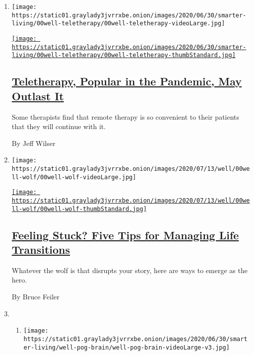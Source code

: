 \begin{enumerate}
\def\labelenumi{\arabic{enumi}.}
\item
  \texttt{[image: https://static01.graylady3jvrrxbe.onion/images/2020/06/30/smarter-living/00well-teletherapy/00well-teletherapy-videoLarge.jpg]}

  \href{/2020/07/09/well/mind/teletherapy-mental-health-coronavirus.html}{\texttt{[image: https://static01.graylady3jvrrxbe.onion/images/2020/06/30/smarter-living/00well-teletherapy/00well-teletherapy-thumbStandard.jpg]}}

  \hypertarget{teletherapy-popular-in-the-pandemic-may-outlast-it}{%
  \subsection{\texorpdfstring{\href{/2020/07/09/well/mind/teletherapy-mental-health-coronavirus.html}{Teletherapy,
  Popular in the Pandemic, May Outlast
  It}}{Teletherapy, Popular in the Pandemic, May Outlast It}}\label{teletherapy-popular-in-the-pandemic-may-outlast-it}}

  Some therapists find that remote therapy is so convenient to their
  patients that they will continue with it.

  By Jeff Wilser
\item
  \texttt{[image: https://static01.graylady3jvrrxbe.onion/images/2020/07/13/well/00well-wolf/00well-wolf-videoLarge.jpg]}

  \href{/2020/07/16/well/mind/managing-life-transitions.html}{\texttt{[image: https://static01.graylady3jvrrxbe.onion/images/2020/07/13/well/00well-wolf/00well-wolf-thumbStandard.jpg]}}

  \hypertarget{feeling-stuck-five-tips-for-managing-life-transitions}{%
  \subsection{\texorpdfstring{\href{/2020/07/16/well/mind/managing-life-transitions.html}{Feeling
  Stuck? Five Tips for Managing Life
  Transitions}}{Feeling Stuck? Five Tips for Managing Life Transitions}}\label{feeling-stuck-five-tips-for-managing-life-transitions}}

  Whatever the wolf is that disrupts your story, here are ways to emerge
  as the hero.

  By Bruce Feiler
\item
  \begin{enumerate}
  \def\labelenumii{\arabic{enumii}.}
  \item
    \texttt{[image: https://static01.graylady3jvrrxbe.onion/images/2020/06/30/smarter-living/well-pog-brain/well-pog-brain-videoLarge-v3.jpg]}


\end{enumerate}
\end{enumerate}
